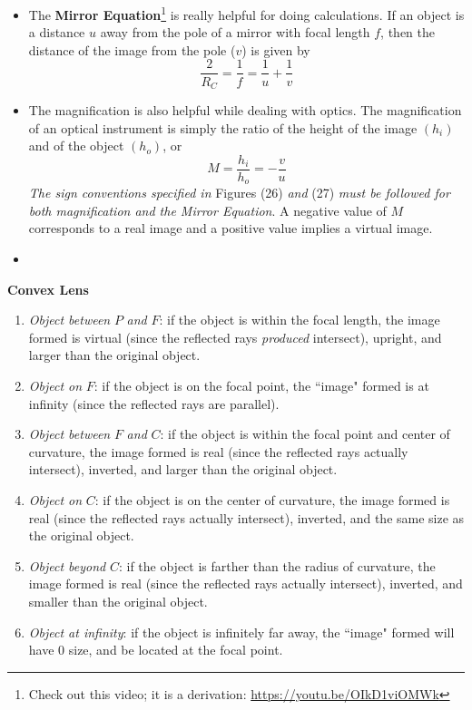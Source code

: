 \documentclass{scrartcl}
\begin{document}
    \begin{itemize}
        \item The \textbf{Mirror Equation}\footnote[6]{Check out this video; it is a derivation: \url{https://youtu.be/OIkD1viOMWk}} is really helpful for doing calculations. If an object is a distance $u$ away from the pole of a mirror with focal length $f$, then the distance of the image from the pole ($v$) is given by \[\frac2{R_C}=\boxed{\frac1f=\frac1u+\frac1v}\]
        \item The magnification is also helpful while dealing with optics. The magnification of an optical instrument is simply the ratio of the height of the image $\left(h_i\right)$ and of the object $\left(h_o\right)$, or \[\boxed{M=\frac{h_i}{h_o}=-\frac vu}\] \textit{The sign conventions specified in} Figures (26) \textit{and} (27) \textit{must be followed for both magnification and the Mirror Equation}. A negative value of $M$ corresponds to a real image and a positive value implies a virtual image.
        \item
    \end{itemize}
    \quad\textbf{Convex Lens}
    \begin{enumerate}
        \item \textit{Object between} $P$ \textit{and} $F$: if the object is within the focal length, the image formed is virtual (since the reflected rays \textit{produced} intersect), upright, and larger than the original object.
        \item \textit{Object on} $F$: if the object is on the focal point, the ``image" formed is at infinity (since the reflected rays are parallel).
        \item \textit{Object between} $F$ \textit{and} $C$: if the object is within the focal point and center of curvature, the image formed is real (since the reflected rays actually intersect), inverted, and larger than the original object.
        \item \textit{Object on} $C$: if the object is on the center of curvature, the image formed is real (since the reflected rays actually intersect), inverted, and the same size as the original object.
        \item \textit{Object beyond} $C$: if the object is farther than the radius of curvature, the image formed is real (since the reflected rays actually intersect), inverted, and smaller than the original object.
        \item \textit{Object at infinity}: if the object is infinitely far away, the ``image" formed will have 0 size, and be located at the focal point.
    \end{enumerate}
\end{document}
